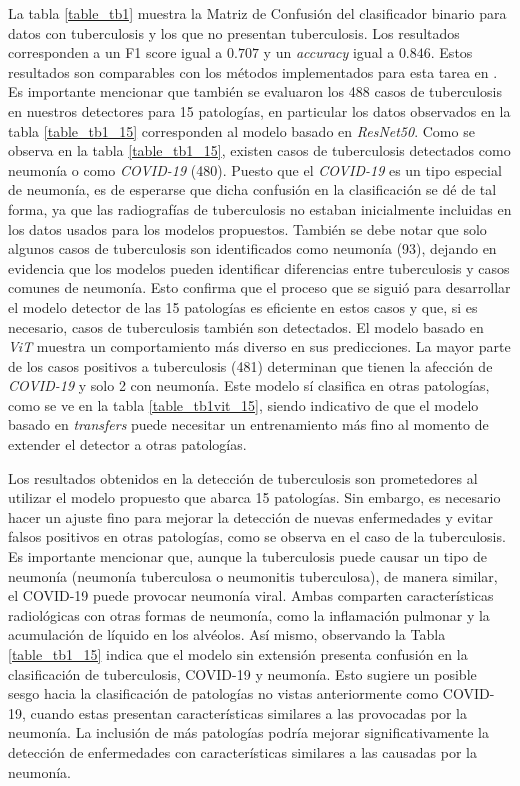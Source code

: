 La tabla \ref{table_tb1} muestra la Matriz de Confusión del clasificador binario para datos con
tuberculosis y los que no presentan tuberculosis. Los resultados corresponden a un F1 score igual a
$0.707$ y un \textit{accuracy} igual a $0.846$. Estos resultados son comparables con los métodos
implementados para esta tarea en \cite{puttagunta2021detection}. Es importante mencionar que también
se evaluaron los 488 casos de tuberculosis en nuestros detectores para 15 patologías, en particular
los datos observados en la tabla \ref{table_tb1_15} corresponden al modelo basado en \textit{ResNet50}.
Como se observa en la tabla \ref{table_tb1_15}, existen casos de tuberculosis detectados como neumonía
o como \textit{COVID-19} (480). Puesto que el \textit{COVID-19} es un tipo especial de neumonía, es de
esperarse que dicha confusión en la clasificación se dé de tal forma, ya que las radiografías de
tuberculosis no estaban inicialmente incluidas en los datos usados para los modelos propuestos. También
se debe notar que solo algunos casos de tuberculosis son identificados como neumonía (93), dejando en
evidencia que los modelos pueden identificar diferencias entre tuberculosis y casos comunes de neumonía.
Esto confirma que el proceso que se siguió para desarrollar el modelo detector de las 15 patologías es
eficiente en estos casos y que, si es necesario, casos de tuberculosis también son detectados. El modelo
basado en \textit{ViT} muestra un comportamiento más diverso en sus predicciones. La mayor parte de los
casos positivos a tuberculosis (481) determinan que tienen la afección de \textit{COVID-19} y solo 2 con
neumonía. Este modelo sí clasifica en otras patologías, como se ve en la tabla \ref{table_tb1vit_15},
siendo indicativo de que el modelo basado en \textit{transfers} puede necesitar un entrenamiento más fino
al momento de extender el detector a otras patologías.


Los resultados obtenidos en la detección de tuberculosis son prometedores al utilizar el modelo propuesto que abarca 15
patologías. Sin embargo, es necesario hacer un ajuste fino para mejorar la detección de nuevas enfermedades y evitar
falsos positivos en otras patologías, como se observa en el caso de la tuberculosis. Es importante mencionar que, aunque
la tuberculosis puede causar un tipo de neumonía (neumonía tuberculosa o neumonitis tuberculosa), de manera similar,
el COVID-19 puede provocar neumonía viral. Ambas comparten características radiológicas con otras formas de neumonía,
como la inflamación pulmonar y la acumulación de líquido en los alvéolos. Así mismo, observando la Tabla
\ref{table_tb1_15} indica que el modelo sin extensión presenta confusión en la clasificación de tuberculosis, COVID-19
y neumonía. Esto sugiere un posible sesgo hacia la clasificación de patologías no vistas anteriormente como COVID-19,
cuando estas presentan características similares a las provocadas por la neumonía. La inclusión de más patologías podría
mejorar significativamente la detección de enfermedades con características similares a las causadas por la neumonía.

